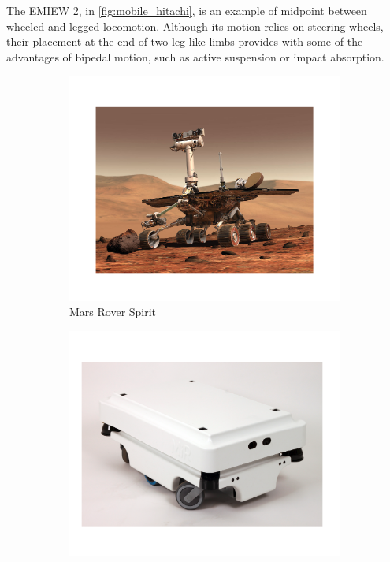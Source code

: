The EMIEW 2, in \ref{fig:mobile_hitachi}, is an example of midpoint between wheeled and legged locomotion.
Although its motion relies on steering wheels, their placement at the end of two leg-like limbs provides with some of the advantages of bipedal motion, such as active suspension or impact absorption.

\begin{figure}[h]
\label{fig:mobile_robots}
	\centering
    \begin{subfigure}[b]{0.32\textwidth}
        \includegraphics[width=\textwidth]{figures/mobile_rover.pdf}
        \caption{Mars Rover Spirit}
        \label{fig:mobile_rover}
    \end{subfigure}
    \centering
    \begin{subfigure}[b]{0.32\textwidth}
        \includegraphics[width=\textwidth]{figures/mobile_mir.pdf}

\end{subfigure}
\end{figure}
